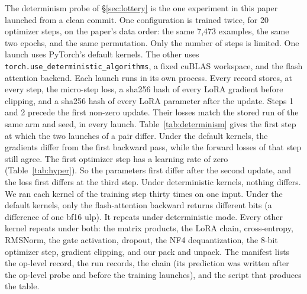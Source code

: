 \documentclass[11pt,letterpaper]{article}
\begin{document}
\medskip
The determinism probe of \S\ref{sec:lottery} is the one experiment in this paper launched from a clean commit. One configuration is trained twice, for 20 optimizer steps, on the paper's data order: the same 7{,}473 examples, the same two epochs, and the same permutation. Only the number of steps is limited. One launch uses PyTorch's default kernels. The other uses \texttt{torch.use\_deterministic\_algorithms}, a fixed cuBLAS workspace, and the flash attention backend. Each launch runs in its own process. Every record stores, at every step, the micro-step loss, a sha256 hash of every LoRA gradient before clipping, and a sha256 hash of every LoRA parameter after the update. Steps 1 and 2 precede the first non-zero update. Their losses match the stored run of the same arm and seed, in every launch. Table~\ref{tab:determinism} gives the first step at which the two launches of a pair differ. Under the default kernels, the gradients differ from the first backward pass, while the forward losses of that step still agree. The first optimizer step has a learning rate of zero (Table~\ref{tab:hyper}). So the parameters first differ after the second update, and the loss first differs at the third step. Under deterministic kernels, nothing differs. We ran each kernel of the training step thirty times on one input. Under the default kernels, only the flash-attention backward returns different bits (a difference of one bf16 ulp). It repeats under deterministic mode. Every other kernel repeats under both: the matrix products, the LoRA chain, cross-entropy, RMSNorm, the gate activation, dropout, the NF4 dequantization, the 8-bit optimizer step, gradient clipping, and our pack and unpack. The manifest lists the op-level record, the run records, the chain (its prediction was written after the op-level probe and before the training launches), and the script that produces the table.
\end{document}
